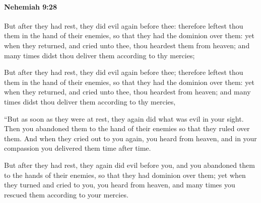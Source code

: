 		\paragraph{Nehemiah 9:28} %
			\label{NEHEMIAH-9-28}

			But after they had rest, they did evil again before thee: therefore leftest thou them in the hand of their enemies, so that they had the dominion over them: yet when they returned, and cried unto thee, thou heardest them from heaven; and many times didst thou deliver them according to thy mercies;

			\begin{versebox}
					\item[BHS] 
					\item[LXX] 
					\item[ASV] But after they had rest, they did evil again before thee; therefore leftest thou them in the hand of their enemies, so that they had the dominion over them: yet when they returned, and cried unto thee, thou heardest from heaven; and many times didst thou deliver them according to thy mercies,
					\item[NIV] “But as soon as they were at rest, they again did what was evil in your sight. Then you abandoned them to the hand of their enemies so that they ruled over them. And when they cried out to you again, you heard from heaven, and in your compassion you delivered them time after time.
					\item[NRSV] But after they had rest, they again did evil before you, and you abandoned them to the hands of their enemies, so that they had dominion over them; yet when they turned and cried to you, you heard from heaven, and many times you rescued them according to your mercies.
			\end{versebox}

